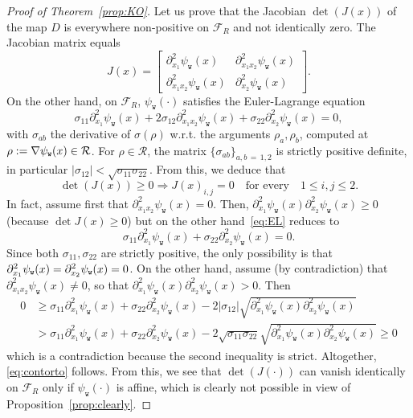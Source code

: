\documentclass[AHL,Unicode,longabstracts,published]{cedram}
\newcommand{\ttw}{\mathtt{w}}
\newcommand{\clR}{\mathcal{R}}
\newcommand{\clF}{\mathcal{F}}
\newcommand{\ttw}{\mathtt{w}}
\begin{document}
\begin{proof}[Proof of Theorem~\ref{prop:KO}]
Let us prove that the Jacobian $\det(J(x))$ of the map $D $ is everywhere non-positive on $\clF_R$ and not identically zero. The Jacobian matrix equals
\begin{equation}\label{eq:J}
J(x)=
\begin{bmatrix}
\partial^2_{x_1}\psi_{\ttw}(x)&\partial^2_{x_1 x_2}\psi_{\ttw}(x)\\[0.10em]
\partial^2_{x_1 x_2}\psi_{\ttw}(x)&\partial^2_{x_2}\psi_{\ttw}(x)
\end{bmatrix}.
\end{equation}
On the other hand, on $\clF_R$, $\psi_{\ttw}(\cdot)$ satisfies the Euler-Lagrange equation
\begin{equation}\label{eq:EL}
\sigma_{11}\partial^2_{x_1}\psi_{\ttw}(x)+2 \sigma_{12} \partial^2_{x_1x_2}\psi_{\ttw}(x)+
\sigma_{22} \partial^2_{x_2}\psi_{\ttw}(x)=0,
\end{equation}
with $\sigma_{ab}$ the derivative of $\sigma(\rho)$ w.r.t. the arguments $\rho_a,\rho_b$, computed at $\rho:=\nabla\psi_{\ttw}(x)\linebreak\in\clR$. For $\rho\in \clR$, the matrix $\{\sigma_{ab}\}_{a,b\,=\,1,2}$ is strictly positive definite, in particular $|\sigma_{12}|<\sqrt{\sigma_{11}\sigma_{22}}$. From this, we deduce that
\begin{equation}\label{eq:contorto}
\det(J(x))\ge0\Rightarrow J(x)_{i,j}=0 \quad \text{for every} \quad 1\le i,j\le 2.
\end{equation}
In fact, assume first that $\partial^2_{x_1x_2}\psi_{\ttw}(x)=0$. Then, $\partial^2_{x_1}\psi_{\ttw}(x) \partial^2_{x_2}\psi_{\ttw}(x)\ge0$ (because $\det J(x)\ge0$) but on the other hand~\eqref{eq:EL} reduces to
\begin{equation}\label{eq:ELbis}
\sigma_{11}\partial^2_{x_1}\psi_{\ttw}(x)+
\sigma_{22} \partial^2_{x_2}\psi_{\ttw}(x)=0.
\end{equation}
Since both $\sigma_{11},\sigma_{22}$ are strictly positive, the only possibility is that $\partial^2_{x_1}\psi_{\ttw}(x)\linebreak= \partial^2_{x_2}\psi_{\ttw}(x)=0$. On the other hand, assume (by contradiction) that $\partial^2_{x_1x_2}\psi_{\ttw}(x)\ne0$, so that $\partial^2_{x_1}\psi_{\ttw}(x) \partial^2_{x_2}\psi_{\ttw}(x)>0$. Then
\begin{equation}\label{eq:contr}
\begin{aligned}
0 &\ge \sigma_{11}\partial^2_{x_1}\psi_{\ttw}(x)+\sigma_{22}\partial^2_{x_2}\psi_{\ttw}(x)-2 |\sigma_{12}|\sqrt{\partial^2_{x_1}\psi_{\ttw}(x)\partial^2_{x_2}\psi_{\ttw}(x)}\\
&> \sigma_{11}\partial^2_{x_1}\psi_{\ttw}(x)+\sigma_{22}\partial^2_{x_2}\psi_{\ttw}(x)-2 \sqrt{\sigma_{11}\sigma_{22}}\sqrt{\partial^2_{x_1}\psi_{\ttw}(x)\partial^2_{x_2}\psi_{\ttw}(x)}\ge0
\end{aligned}
\end{equation}
which is a contradiction because the second inequality is strict. Altogether, \eqref{eq:contorto} follows. From this, we see that $\det(J(\cdot))$ can vanish identically on $\clF_R$ only if $\psi_{\ttw}(\cdot)$ is affine, which is clearly not possible in view of Proposition~\ref{prop:clearly}.


\end{proof}
\end{document}
